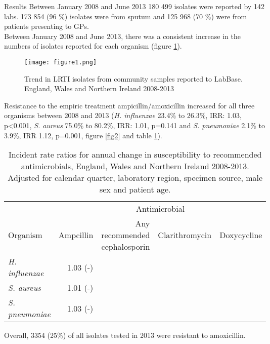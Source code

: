 \documentclass[final]{beamer}
\begin{document}
\begin{frame}
\begin{columns}[t]
    \begin{block}{Results}
   Between January 2008 and June 2013 180 499 isolates were reported by 142 labs. 
   173 854 (96 \%) isolates were from sputum and 125 968 (70 \%) were from patients presenting to GPs. \\
   Between January 2008 and June 2013, there was a consistent increase in the numbers of isolates reported for each organism (figure \ref{fig1}).
   \begin{figure}
   \texttt{[image: figure1.png]}
   \caption{Trend in LRTI isolates from community samples reported to LabBase. England, Wales and Northern Ireland 2008-2013}
   \label{fig1}
   \end{figure}
   Resistance to the empiric treatment ampicillin/amoxicillin increased for all three organisms between 2008 and 2013 (\textit{H. influenzae} 23.4\% to 26.3\%, IRR: 1.03, p\textless0.001, \textit{S. aureus} 75.0\% to 80.2\%, IRR: 1.01, p=0.141 and \textit{S. pneumoniae} 2.1\% to 3.9\%, IRR 1.12, p=0.001, figure \ref{fig2} and table \ref{table1}).\\
   \vspace{1 cm}
   \begin{table}
   \centering
   \begin{tabular}{lrrrr}
   \toprule
    & \multicolumn{4}{c}{Antimicrobial}\\
    \cline{2-5}
   Organism & Ampcillin & \shortstack{Any recommended \\ cephalosporin} & Clarithromycin & Doxycycline\\
   \midrule
	   \textit{H. influenzae} & 1.03 (-) & & & \\
	   \textit{S. aureus} & 1.01 (-) & & & \\
	   \textit{S. pneumoniae} & 1.03 (-) & & & \\
   \bottomrule
   \end{tabular}
   \caption{Incident rate ratios for annual change in susceptibility to recommended antimicrobials, England, Wales and Northern Ireland 2008-2013.
   Adjusted for calendar quarter, laboratory region, specimen source, male sex and patient age.}
   \label{table1}
   \end{table}
\vspace{1 cm}
   Overall, 3354 (25\%) of all isolates tested in 2013 were resistant to amoxicillin. %
  \end{block}
  

\end{columns}
\end{frame}
\end{document}
